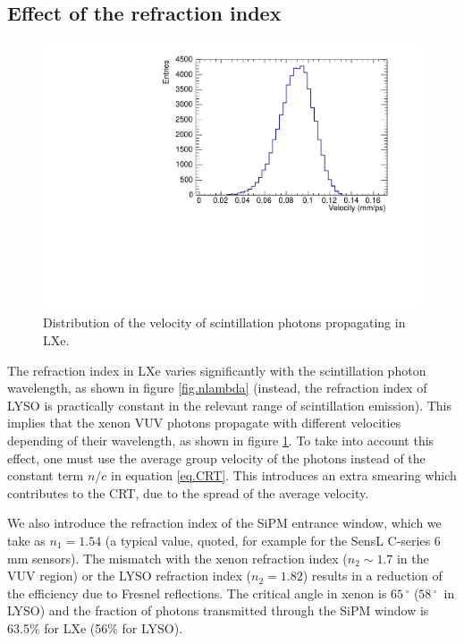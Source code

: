 \documentclass[review]{elsarticle}
\begin{document}
\subsection*{Effect of the refraction index}
\begin{figure}[!bhtp]
	\centering
	\includegraphics[scale=0.4]{../img/VelocityDistrLXe.pdf}
	\caption{\label{fig.vLXe} Distribution of the velocity of scintillation photons propagating in LXe.}
\end{figure}

The refraction index in LXe varies significantly with the scintillation photon wavelength, as shown in figure  \ref{fig.nlambda} (instead, the refraction index of LYSO is practically constant in the relevant range of scintillation
emission). This implies that the xenon VUV photons propagate with different velocities depending of their wavelength, as shown in figure \ref{fig.vLXe}. To take into account this effect, one must use the average group velocity of the photons instead of the constant term $n/c$
in equation \ref{eq.CRT}. This introduces an extra smearing which contributes to the CRT, due to the spread of the average velocity. 

We also introduce the refraction index of the SiPM entrance window, which we take as $n_1 = 1.54$ (a typical value, quoted, for example for the SensL C-series 6 mm sensors). The mismatch with the xenon refraction index
($n_2 \sim 1.7$ in the VUV region) or the LYSO refraction index ($n_2 = 1.82$) results in a reduction of the efficiency due to Fresnel reflections. The critical angle in xenon is $65\,^{\circ}$ ($58\,^{\circ}$~in LYSO) and the fraction of photons transmitted through the SiPM window is 63.5\% for LXe (56\% for LYSO).  
\end{document}
